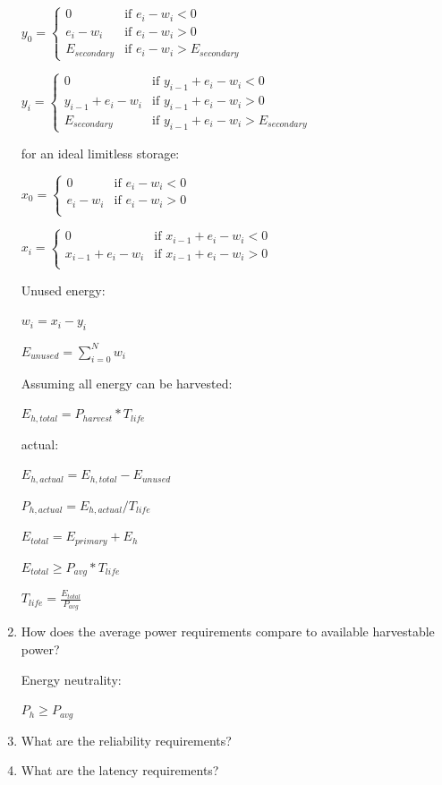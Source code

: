 \begin{enumerate}
    $ y_0 = \begin{cases} 
        0         & \text{if $e_i - w_i < 0$} \\
        e_i - w_i & \text{if $e_i - w_i > 0$} \\
        E_{secondary} & \text{if $e_i - w_i > E_{secondary}$}
    \end{cases}$
    
    $ y_i = \begin{cases} 
        0             & \text{if $y_{i-1} + e_i - w_i < 0$} \\
        y_{i-1} + e_i - w_i     & \text{if $y_{i-1} + e_i - w_i > 0$} \\
        E_{secondary} & \text{if $y_{i-1} + e_i - w_i > E_{secondary}$}
    \end{cases}$
    
    for an ideal limitless storage:
     
    $ x_0 = \begin{cases} 
        0         & \text{if $e_i - w_i < 0$} \\
        e_i - w_i & \text{if $e_i - w_i > 0$} \\
    \end{cases}$
    
    $ x_i = \begin{cases} 
        0             & \text{if $x_{i-1} + e_i - w_i < 0$} \\
        x_{i-1} + e_i - w_i     & \text{if $x_{i-1} + e_i - w_i > 0$} \\
    \end{cases}$
    
    Unused energy:
    
    $ w_i = x_i - y_i$
    
    $ E_{unused} = \sum_{i=0}^N w_i$
    
    Assuming all energy can be harvested:    

    $E_{h, total} = P_{harvest} * T_{life}$
  
    actual:
   
    $E_{h, actual} = E_{h, total} - E_{unused}$ 
    
    $P_{h, actual} = E_{h, actual} / T_{life}$
    
    
   
    $E_{total} = E_{primary} + E_{h} $
    
    $E_{total} \ge P_{avg} * T_{life}$
    
    $T_{life} = \frac{E_{total}}{P_{avg}}$
    
    
\item How does the average power requirements compare to available harvestable power? 
    
    Energy neutrality:
    
    $P_{h} \ge P_{avg}$ 
    
\item What are the reliability requirements?
\item What are the latency requirements?
\end{enumerate}

